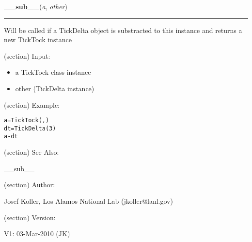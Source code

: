 \hspace{.8\funcindent}\begin{boxedminipage}{\funcwidth}

    \raggedright \textbf{\_\_sub\_\_}(\textit{a}, \textit{other})

    \vspace{-1.5ex}

    \rule{\textwidth}{0.5\fboxrule}
\setlength{\parskip}{2ex}
    Will be called if a TickDelta object is substracted to this instance 
    and returns a new TickTock instance

    (section) Input:

      \begin{itemize}
      \setlength{\parskip}{0.6ex}
        \item a TickTock class instance

        \item other (TickDelta instance)

      \end{itemize}

    (section) Example:

\begin{alltt}
\pysrcprompt{{\textgreater}{\textgreater}{\textgreater} }a = TickTock(, )
\pysrcprompt{{\textgreater}{\textgreater}{\textgreater} }dt = TickDelta(3)
\pysrcprompt{{\textgreater}{\textgreater}{\textgreater} }a - dt
\end{alltt}
    (section) See Also:

      \_\_sub\_\_

    (section) Author:

      Josef Koller, Los Alamos National Lab (jkoller@lanl.gov)

    (section) Version:

      V1: 03-Mar-2010 (JK)

\setlength{\parskip}{1ex}
    \end{boxedminipage}

    \label{spacepy:spacetime:TickTock:__add__}

    \vspace{0.5ex}

